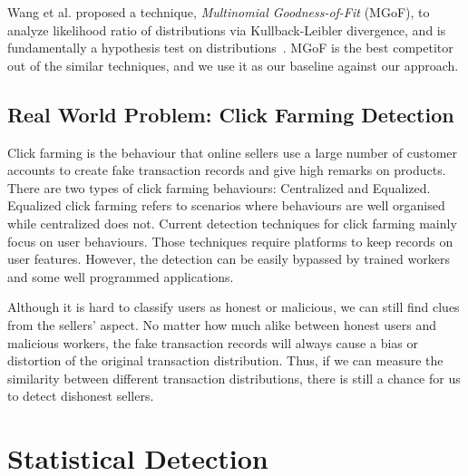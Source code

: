 \documentclass{article}
\begin{document}
			Wang et al. proposed a technique, \textit{Multinomial Goodness-of-Fit} (MGoF), to analyze likelihood ratio of distributions via Kullback-Leibler divergence, and is fundamentally a hypothesis test on distributions~\cite{wang2011statistical}.
			MGoF is the best competitor out of the similar techniques, and we use it as our baseline against our approach.
	
		\subsection{Real World Problem: Click Farming Detection}\label{sec:related-realworld}
			Click farming is the behaviour that online sellers use a large number of customer accounts to create fake transaction records and give high remarks on products.
			There are two types of click farming behaviours: Centralized and Equalized.
			Equalized click farming refers to scenarios where behaviours are well organised while centralized does not.
			Current detection techniques for click farming mainly focus on user behaviours. Those techniques require platforms to keep records on user features. However, the detection can be easily bypassed by trained workers and some well programmed applications.
			
			Although it is hard to classify users as honest or malicious, we can still find clues from the sellers' aspect.
			No matter how much alike between honest users and malicious workers, the fake transaction records will always cause a bias or distortion of the original transaction distribution.
			Thus, if we can measure the similarity between different transaction distributions, there is still a chance for us to detect dishonest sellers.
	
	
	\section{Statistical Detection}\label{sec:algorithm-details}
\end{document}
